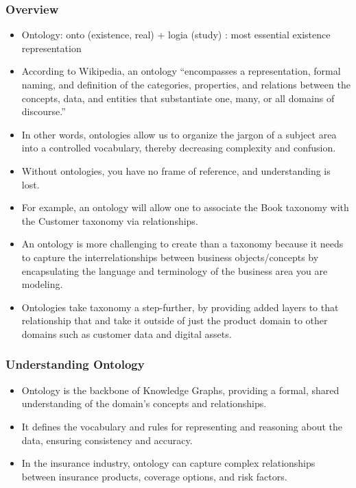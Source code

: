 \begin{frame}[fragile]
\frametitle{Overview}
\begin{itemize}
\item Ontology: onto (existence, real) + logia (study) : most essential existence representation
\item According to Wikipedia, an ontology “encompasses a representation, formal naming, and definition of the categories, properties, and relations between the concepts, data, and entities that substantiate one, many, or all domains of discourse.”
\item In other words, ontologies allow us to organize the jargon of a subject area into a controlled vocabulary, thereby decreasing complexity and confusion. 
\item Without ontologies, you have no frame of reference, and understanding is lost.
\item For example, an ontology will allow one to associate the Book taxonomy with the Customer taxonomy via relationships.
\item An ontology is more challenging to create than a taxonomy because it needs to capture the interrelationships between business objects/concepts by encapsulating the language and terminology of the business area you are modeling.
\item Ontologies take taxonomy a step-further, by providing added layers to that relationship that and take it outside of just the product domain to other domains such as customer data and digital assets.   
\end{itemize}
\end{frame}

\begin{frame}[fragile]
\frametitle{Understanding Ontology}
\begin{itemize}
\item Ontology is the backbone of Knowledge Graphs, providing a formal, shared understanding of the domain's concepts and relationships.
\item It defines the vocabulary and rules for representing and reasoning about the data, ensuring consistency and accuracy.
\item In the insurance industry, ontology can capture complex relationships between insurance products, coverage options, and risk factors.
\end{itemize}
\end{frame}

